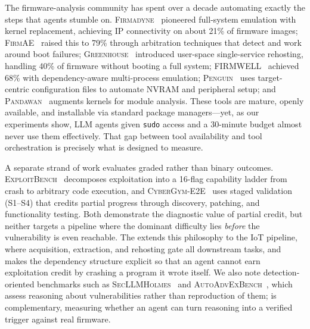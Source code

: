 The firmware-analysis community has spent over a decade automating exactly the steps that agents stumble on. \textsc{Firmadyne}~\cite{firmadyne} pioneered full-system emulation with kernel replacement, achieving IP connectivity on about 21\% of firmware images; \textsc{FirmAE}~\cite{firmae} raised this to 79\% through arbitration techniques that detect and work around boot failures; \textsc{Greenhouse}~\cite{greenhouse} introduced user-space single-service rehosting, handling 40\% of firmware without booting a full system; \textsc{FIRMWELL}~\cite{firmwell} achieved 68\% with dependency-aware multi-process emulation; \textsc{Penguin}~\cite{penguin} uses target-centric configuration files to automate NVRAM and peripheral setup; and \textsc{Pandawan}~\cite{pandawan} augments kernels for module analysis. These tools are mature, openly available, and installable via standard package managers---yet, as our experiments show, LLM agents given \texttt{sudo} access and a 30-minute budget almost never use them effectively. That gap between tool availability and tool orchestration is precisely what \sys is designed to measure.

A separate strand of work evaluates graded rather than binary outcomes. \textsc{ExploitBench}~\cite{exploitbench} decomposes exploitation into a 16-flag capability ladder from crash to arbitrary code execution, and \textsc{CyberGym-E2E}~\cite{cybergyme2e} uses staged validation (S1--S4) that credits partial progress through discovery, patching, and functionality testing. Both demonstrate the diagnostic value of partial credit, but neither targets a pipeline where the dominant difficulty lies \emph{before} the vulnerability is even reachable. The \rrs extends this philosophy to the IoT pipeline, where acquisition, extraction, and rehosting gate all downstream tasks, and makes the dependency structure explicit so that an agent cannot earn exploitation credit by crashing a program it wrote itself. We also note detection-oriented benchmarks such as \textsc{SecLLMHolmes}~\cite{secllmholmes} and \textsc{AutoAdvExBench}~\cite{autoadvexbench}, which assess reasoning about vulnerabilities rather than reproduction of them; \sys is complementary, measuring whether an agent can turn reasoning into a verified trigger against real firmware.
